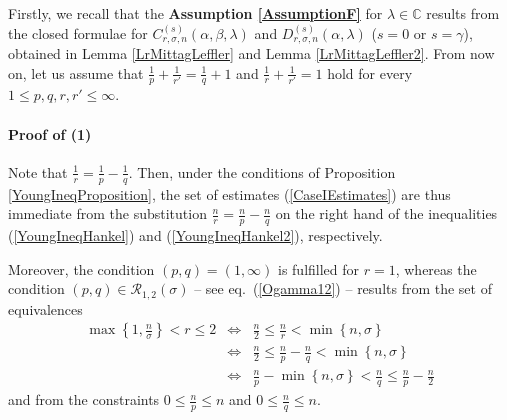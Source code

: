 \documentclass{amsart}
\theoremstyle{definition}
\theoremstyle{remark}
\numberwithin{equation}{section}
\begin{document}
{			Firstly, we recall that the {\bf Assumption \ref{AssumptionF}} for $\lambda\in \mathbb{C}$ results from the closed formulae for $C_{r,\sigma,n}^{(s)}(\alpha,\beta,\lambda)$ and $D_{r,\sigma,n}^{(s)}(\alpha,\lambda)$ ($s=0$ or $s=\gamma$), obtained in Lemma \ref{LrMittagLeffler} and Lemma \ref{LrMittagLeffler2}.
			From now on, let us assume that $\displaystyle \frac{1}{p}+\frac{1}{r'}=\frac{1}{q}+1$ and $\displaystyle \frac{1}{r}+\frac{1}{r'}=1$ hold for every $1\leq p,q,r,r'\leq \infty$.
			
			
			\paragraph{\bf Proof of (1)}
			Note that $\displaystyle \frac{1}{r}=\frac{1}{p}-\frac{1}{q}$. Then, under the conditions of Proposition \ref{YoungIneqProposition}, the set of estimates (\ref{CaseIEstimates}) are thus immediate from the substitution $\displaystyle \frac{n}{r}=\frac{n}{p}-\frac{n}{q}$ on the right hand of the inequalities (\ref{YoungIneqHankel}) and (\ref{YoungIneqHankel2}), respectively.
			
			Moreover, the condition $(p,q)=(1,\infty)$ is fulfilled for $r=1$, whereas the condition $(p,q)\in \mathcal{R}_{1,2}(\sigma)$ -- see eq.~(\ref{Ogamma12}) -- results from the set of equivalences
			\begin{eqnarray*}
				\max\left\{1,\frac{n}{\sigma}\right\}< r\leq 2 &\Longleftrightarrow & \displaystyle \frac{n}{2} \leq  \frac{n}{r}< {\min\left\{n,\sigma\right\}} \\ &\Longleftrightarrow&\displaystyle \frac{n}{2} \leq \frac{n}{p} -\frac{n}{q} < {\min\left\{n,\sigma\right\}}   \\
				&\Longleftrightarrow&\frac{n}{p}-{\min\left\{n,\sigma\right\}}\displaystyle  < \frac{n}{q} \leq \frac{n}{p}-\frac{n}{2}
			\end{eqnarray*}
			and from the constraints $\displaystyle 0\leq \frac{n}{p}\leq n$ and $\displaystyle 0\leq \frac{n}{q}\leq n$.
			
			
}
\end{document}
